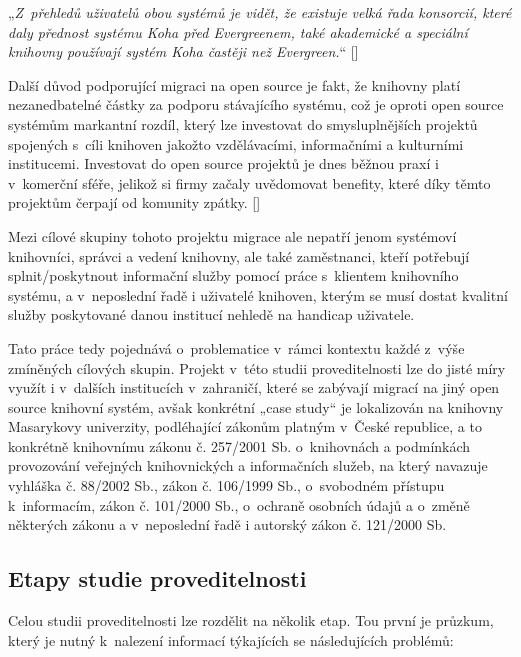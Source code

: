 \documentclass[
	11pt, oneside, printed, final, palatino, monochrome
	microtype,
	table,   %
	lof,     %
	lot     %
]{fithesis3}
\makeatletter
\newcommand{\citepages}[2]{[\cite[#1]{#2}]}
\newcommand{\citesource}[1]{[\cite{#1}]}
\newcommand{\citace}[1]{„\textit{#1}“} %
\newcommand{\mezera}{\bigskip}
\makeatother
\begin{document}
{ \mezera
 \citace{Z~přehledů uživatelů obou systémů je vidět, že existuje velká řada konsorcií, které daly přednost systému Koha před Evergreenem, také akademické a speciální knihovny používají systém Koha častěji než Evergreen.} \citesource{zabickova_2014}
 \mezera

Další důvod podporující migraci na open source je fakt, že knihovny platí nezanedbatelné částky za podporu stávajícího systému, což je oproti open source systémům markantní rozdíl, který lze investovat do smysluplnějších projektů spojených s~cíli knihoven jakožto vzdělávacími, informačními a kulturními institucemi. Investovat do open source projektů je dnes běžnou praxí i v~komerční sféře, jelikož si firmy začaly uvědomovat benefity, které díky těmto projektům čerpají od komunity zpátky. \citepages{129-132}{Fogel2012}

Mezi cílové skupiny tohoto projektu migrace ale nepatří jenom systémoví knihovníci, správci a vedení knihovny, ale také zaměstnanci, kteří potřebují splnit/poskytnout informační služby pomocí práce s~klientem knihovního systému, a v~neposlední řadě i uživatelé knihoven, kterým se musí dostat kvalitní služby poskytované danou institucí nehledě na handicap uživatele.

Tato práce tedy pojednává o~problematice v~rámci kontextu každé z~výše zmíněných cílových skupin. Projekt v~této studii proveditelnosti lze do jisté míry využít i v~dalších institucích v~zahraničí, které se zabývají migrací na jiný open source knihovní systém, avšak konkrétní „case study“ je lokalizován na knihovny Masarykovy univerzity, podléhající zákonům platným v~České republice, a to konkrétně knihovnímu zákonu č. 257/2001 Sb. o~knihovnách a podmínkách provozování veřejných knihovnických a informačních služeb, na který navazuje vyhláška č. 88/2002 Sb., zákon č. 106/1999 Sb., o~svobodném přístupu k~informacím, zákon č. 101/2000 Sb., o~ochraně osobních údajů a o~změně některých zákonu a v~neposlední řadě i autorský zákon č. 121/2000 Sb.

\subsection{Etapy studie proveditelnosti}

Celou studii proveditelnosti lze rozdělit na několik etap. Tou první je průzkum, který je nutný k~nalezení informací týkajících se následujících problémů:

}
\end{document}
